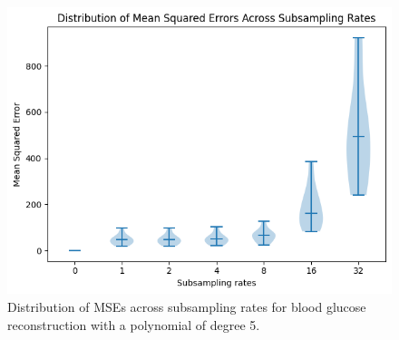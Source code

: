 \begin{figure}[h] %
	\centering
	\includegraphics[width=\linewidth]{Figures/distribution_mses_poly5.png} %
	\caption{Distribution of MSEs across subsampling rates for blood glucose reconstruction with a polynomial of degree 5.}
	\label{fig:mses_poly5}  %
\end{figure}


